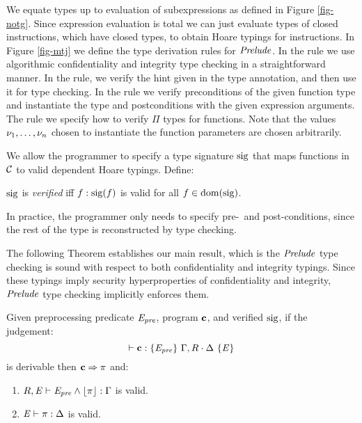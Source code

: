 \mtjfig

We equate types up to evaluation of subexpressions as defined in
Figure \ref{fig-notg}. Since expression evaluation is total we can
just evaluate types of closed instructions, which have closed types,
to obtain Hoare typings for instructions. In Figure \ref{fig-mtj} we
define the type derivation rules for $\mathit{Prelude}$. In the
 rule we use algorithmic confidentiality and integrity
type checking in a straightforward manner.  In the 
rule, we verify the hint given in the type annotation, and then use it
for type checking.  In the  rule we verify preconditions
of the given function type and instantiate the type and postconditions
with the given expression arguments.  The  rule we
specify how to verify $\Pi$ types for functions. Note that the values
$\nu_1,\ldots,\nu_n$ chosen to instantiate the function parameters are
chosen arbitrarily.

We allow the programmer to specify a type signature $\mathrm{sig}$ that
maps functions in $\mathcal{C}$ to valid dependent Hoare
typings. Define:
\begin{definition}
  $\mathrm{sig}$ is \emph{verified} iff $f : \mathrm{sig}(f)$ is valid for all $f \in \mathrm{dom}(\mathrm{sig})$.
\end{definition}
In practice, the programmer only needs to specify pre-~and post-conditions,
since the rest of the type is reconstructed by type checking.

The following Theorem establishes our main result, which
is the $\mathit{Prelude}$ type checking is sound with respect to both
confidentiality and integrity typings. Since these typings
imply security hyperproperties of confidentiality and integrity,
$\mathit{Prelude}$ type checking implicitly enforces them.
\begin{theorem}
  Given preprocessing predicate $\mathit{E}_{\mathit{pre}}$, program $\mathbf{c}$, and verified $\mathrm{sig}$, if
  the judgement: $$\vdash \mathbf{c} : \{ \mathit{E}_{\mathit{pre}} \}\ \Gamma,R \cdot \Delta\ \{ \mathit{E} \}$$ is derivable then
  $\mathbf{c} \Rightarrow \pi$ and:
  \begin{enumerate}
  \item $R,\mathit{E} \vdash \mathit{E}_{\mathit{pre}} \wedge \lfloor \pi \rfloor : \Gamma$ is valid.
  \item $\mathit{E} \vdash \pi : \Delta$ is valid.
  \end{enumerate}
\end{theorem}
